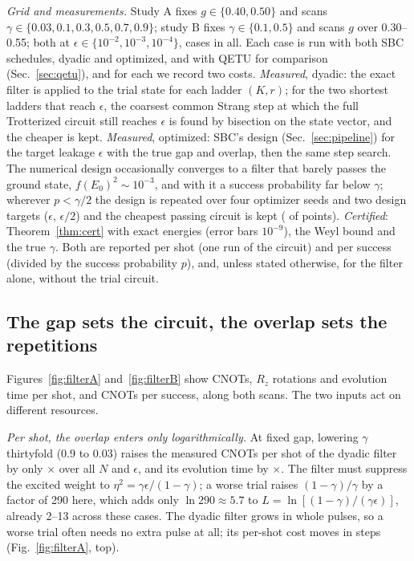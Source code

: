 \documentclass[aps,pra,twocolumn,superscriptaddress,nofootinbib]{revtex4-2}
\begin{document}
\emph{Grid and measurements.} Study A fixes $g\in\{0.40,0.50\}$ and scans
$\gamma\in\{0.03,0.1,0.3,0.5,0.7,0.9\}$; study B fixes $\gamma\in\{0.1,0.5\}$ and scans $g$ over 0.30--0.55;
both at $\epsilon\in\{10^{-2},10^{-3},10^{-4}\}$, \goNcases{} cases in all. Each case is run with both SBC
schedules, dyadic and optimized, and with QETU for comparison (Sec.~\ref{sec:qetu}), and for each we record
two costs. \emph{Measured}, dyadic: the exact filter is applied to the trial state for each ladder $(K,r)$;
for the two shortest ladders that reach $\epsilon$, the coarsest common Strang step at which the full
Trotterized circuit still reaches $\epsilon$ is found by bisection on the state vector, and the cheaper is
kept. \emph{Measured}, optimized: SBC's design (Sec.~\ref{sec:pipeline}) for the target leakage $\epsilon$ with
the true gap and overlap, then the same step search. The numerical design occasionally converges to a
filter that barely passes the ground state, $f(E_0)^2\sim10^{-3}$, and with it a success probability far
below $\gamma$; wherever $p<\gamma/2$ the design is repeated over four optimizer seeds and two design targets
($\epsilon$, $\epsilon/2$) and the cheapest passing circuit is kept (\optRetried{} of \optPoints{} points). \emph{Certified}: Theorem~\ref{thm:cert} with exact energies (error bars $10^{-9}$), the Weyl bound and
the true $\gamma$. Both are reported per shot (one run of the circuit) and per success (divided by the
success probability $p$), and, unless stated otherwise, for the filter alone, without the trial circuit.

\subsection{The gap sets the circuit, the overlap sets the repetitions}

Figures~\ref{fig:filterA} and~\ref{fig:filterB} show CNOTs, $R_z$ rotations and evolution time per shot, and
CNOTs per success, along both scans. The two inputs act on different resources.

\emph{Per shot, the overlap enters only logarithmically.} At fixed gap, lowering $\gamma$ thirtyfold (0.9 to
0.03) raises the measured CNOTs per shot of the dyadic filter by only \fAMDcnot$\times$ over all $N$ and
$\epsilon$, and its evolution time by \fAMDtime$\times$. The filter must suppress the excited weight to
$\eta^2=\gamma\epsilon/(1-\gamma)$; a worse trial raises $(1-\gamma)/\gamma$ by a factor of 290 here, which adds
only $\ln290\approx5.7$ to $L=\ln[(1-\gamma)/(\gamma\epsilon)]$, already 2--13 across these cases. The dyadic
filter grows in whole pulses, so a worse trial often needs no extra pulse at all; its per-shot cost moves in
steps (Fig.~\ref{fig:filterA}, top).
\end{document}
